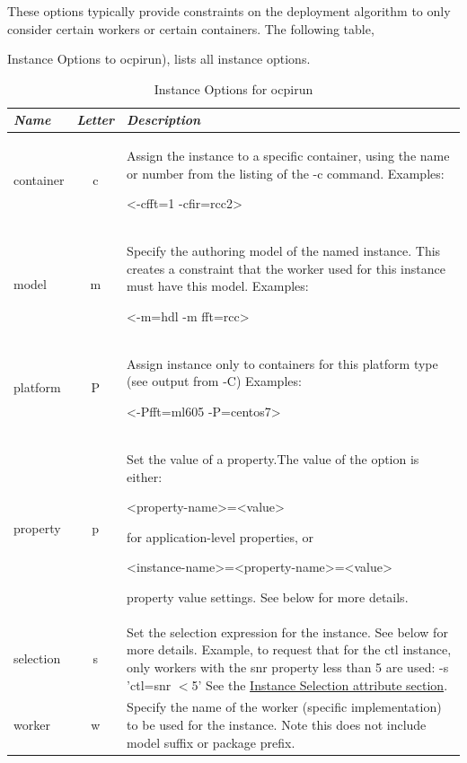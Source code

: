 \documentclass[10pt, a4paper, oneside]{article}
\renewcommand*{\arraystretch}{2.5}%
\renewcommand\_{\textunderscore\allowbreak} %
\begin{document}
These options typically provide constraints on the deployment algorithm to only consider certain workers or certain containers. The following table,{Instance Options to ocpirun), lists all instance options.
\begin{table}[h]
\caption{Instance Options for ocpirun}\label{tab:Instance Options to ocpirun}
\renewcommand*{\arraystretch}{2.5}
\center
\begin{tabular}[c]{|l|c | p{12cm}|}
\hline
\emph{Name} & \emph{Letter} & \emph{Description}\\
\hline
container & c & Assign the instance to a specific container, using the name or number from the listing of the -c command.
Examples:  \begin{ocpixml}
<-cfft=1 -cfir=rcc2>\end{ocpixml}\\ 
\hline  
model	& m	& Specify the authoring model of the named instance.  This creates a constraint that the worker used for this instance must have this model. Examples:  \begin{ocpixml}
<-m=hdl -m fft=rcc>\end{ocpixml}\\ 
\hline 
platform & P	& Assign instance only to containers for this platform type (see output from -C)
Examples:  \begin{ocpixml}
<-Pfft=ml605 -P=centos7>\end{ocpixml}\\   
\hline 
property	& p	& Set the value of a property.The value of the option is either:
\begin{ocpixml}
<property-name>=<value>\end{ocpixml}for application-level properties, or 
\begin{ocpixml}
<instance-name>=<property-name>=<value>\end{ocpixml} 
property value settings. See below for more details. \\ 
\hline 
selection & s & Set the selection expression for the instance.  See below for more details.  
Example, to request that for the ctl instance, only workers with the snr property less than 5 are used: -s 'ctl=snr $<$5' See the \hyperlink{sec:Selection attribute (optional)}{Instance Selection attribute section}.\\ 
\hline 
worker & w & Specify the name of the worker (specific implementation) to be used for the instance.
Note this does not include model suffix or package prefix.\\ 
\hline
\end{tabular}
\end{table}

}
\end{document}
